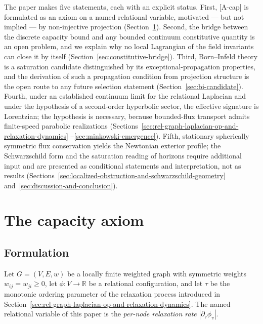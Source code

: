 \documentclass[epj]{svjour}
\begin{document}
    The paper makes five statements, each with an explicit status.
    First, [A-cap] is formulated as an axiom on a named relational variable, motivated --- but not
    implied --- by non-injective projection (Section~\ref{sec:capacity-axiom}).
    Second, the bridge between the discrete capacity bound and any bounded continuum constitutive
    quantity is an open problem, and we explain why no local Lagrangian of the field invariants can
    close it by itself (Section~\ref{sec:constitutive-bridge}).
    Third, Born--Infeld theory is a saturation candidate distinguished by its exceptional-propagation
    properties, and the derivation of such a propagation condition from projection structure is the
    open route to any future selection statement (Section~\ref{sec:bi-candidate}).
    Fourth, under an established continuum limit for the relational Laplacian and under the
    hypothesis of a second-order hyperbolic sector, the effective signature is Lorentzian; the
    hypothesis is necessary, because bounded-flux transport admits finite-speed parabolic
    realizations (Sections~\ref{sec:rel-graph-laplacian-op-and-relaxation-dynamics}%
    --\ref{sec:minkowski-emergence}).
    Fifth, stationary spherically symmetric flux conservation yields the Newtonian exterior profile;
    the Schwarzschild form and the saturation reading of horizons require additional input and are
    presented as conditional statements and interpretation, not as results
    (Sections~\ref{sec:localized-obstruction-and-schwarzschild-geometry}%
    and~\ref{sec:discussion-and-conclusion}).

  \section{The capacity axiom}
    \label{sec:capacity-axiom}

    \subsection{Formulation}
      \label{subsec:capacity-formulation}

      Let $G = (V, E, w)$ be a locally finite weighted graph with symmetric weights
      $w_{ij} = w_{ji} \ge 0$, let $\phi : V \to \mathbb{R}$ be a relational configuration, and let
      $\tau$ be the monotonic ordering parameter of the relaxation process introduced in
      Section~\ref{sec:rel-graph-laplacian-op-and-relaxation-dynamics}.
      The named relational variable of this paper is the \emph{per-node relaxation rate}
      $|\partial_\tau \phi_v|$.
\end{document}

